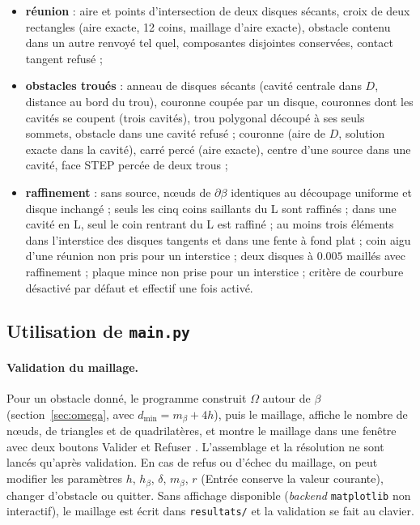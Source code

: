 \documentclass[11pt,a4paper]{article}
\begin{document}
\begin{itemize}
        $r \ge R$, éléments retournés ;
  \item \textbf{réunion} : aire et points d'intersection de deux disques
        sécants, croix de deux rectangles (aire exacte, 12 coins, maillage
        d'aire exacte), obstacle contenu dans un autre renvoyé tel quel,
        composantes disjointes conservées, contact tangent refusé ;
  \item \textbf{obstacles troués} : anneau de disques sécants (cavité centrale
        dans $D$, distance au bord du trou), couronne coupée par un disque,
        couronnes dont les cavités se coupent (trois cavités), trou polygonal
        découpé à ses seuls sommets, obstacle dans une cavité refusé ;
        couronne (aire de $D$, solution exacte dans la cavité), carré percé
        (aire exacte), centre d'une source dans une cavité, face STEP percée
        de deux trous ;
  \item \textbf{raffinement} : sans source, nœuds de $\partial\beta$
        identiques au découpage uniforme et disque inchangé ; seuls les cinq
        coins saillants du L sont raffinés ; dans une cavité en L, seul le
        coin rentrant du L est raffiné ; au moins trois éléments dans
        l'interstice des disques tangents et dans une fente à fond plat ;
        coin aigu d'une réunion non pris pour un interstice ; deux disques à
        $0.005$ maillés avec raffinement ; plaque mince non prise pour un
        interstice ; critère de courbure désactivé par défaut et effectif une
        fois activé.
\end{itemize}

\subsection{Utilisation de \texttt{main.py}}
\label{sec:usage}

\paragraph{Validation du maillage.} Pour un obstacle donné, le programme
construit $\Omega$ autour de $\beta$ (section~\ref{sec:omega}, avec
$d_{\min} = m_\beta + 4h$), puis le maillage, affiche le nombre de nœuds,
de triangles et de quadrilatères, et montre le maillage dans une fenêtre
avec deux boutons \og Valider \fg{} et \og Refuser \fg{}. L'assemblage et la
résolution ne sont lancés qu'après validation. En cas de
refus ou d'échec du maillage, on peut modifier les paramètres $h$,
$h_\beta$, $\delta$, $m_\beta$, $r$ (Entrée conserve la valeur courante), changer
d'obstacle ou quitter. Sans affichage disponible (\emph{backend}
\texttt{matplotlib} non interactif), le maillage est écrit dans
\texttt{resultats/} et la validation se fait au clavier.
\end{document}
